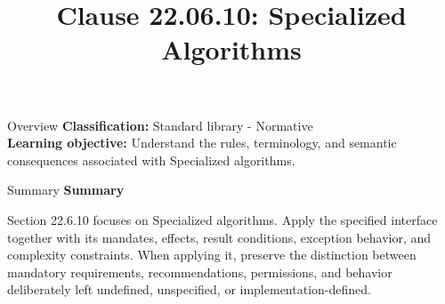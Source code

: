 \documentclass[10pt,letterpaper]{article}
\title{Clause 22.06.10: Specialized Algorithms}
\author{}
\date{}
\begin{document}
\maketitle
\begin{CornellOverviewBox}{Overview}
\textbf{Classification:} Standard library - Normative\\[2pt]
\textbf{Learning objective:} Understand the rules, terminology, and semantic consequences associated with Specialized algorithms.
\end{CornellOverviewBox}\begin{CornellSummaryBox}{Summary}
{\sffamily\bfseries\color{Accent} Summary}\par\vspace{3pt}Section 22.6.10 focuses on Specialized algorithms. Apply the specified interface together with its mandates, effects, result conditions, exception behavior, and complexity constraints. When applying it, preserve the distinction between mandatory requirements, recommendations, permissions, and behavior deliberately left undefined, unspecified, or implementation-defined.
\end{CornellSummaryBox}
\end{document}
